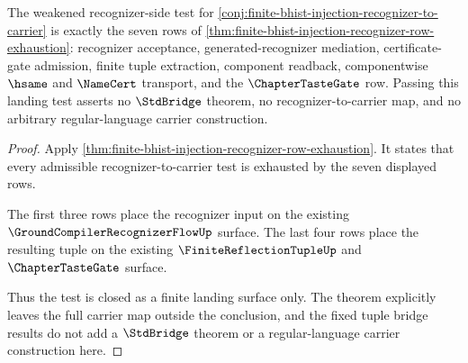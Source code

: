 \begin{proposition}
\label{prop:finite-bhist-injection-recognizer-closed-landing-test}
The weakened recognizer-side test for \autoref{conj:finite-bhist-injection-recognizer-to-carrier} is exactly the seven rows of \autoref{thm:finite-bhist-injection-recognizer-row-exhaustion}: recognizer acceptance, generated-recognizer mediation, certificate-gate admission, finite tuple extraction, component readback, componentwise $\hsame$ and $\NameCert$ transport, and the $\ChapterTasteGate$ row. Passing this landing test asserts no $\StdBridge$ theorem, no recognizer-to-carrier map, and no arbitrary regular-language carrier construction.
\end{proposition}
\begin{proof}
Apply \autoref{thm:finite-bhist-injection-recognizer-row-exhaustion}. It states that every admissible recognizer-to-carrier test is exhausted by the seven displayed rows.

The first three rows place the recognizer input on the existing $\GroundCompilerRecognizerFlowUp$ surface. The last four rows place the resulting tuple on the existing $\FiniteReflectionTupleUp$ and $\ChapterTasteGate$ surface.

Thus the test is closed as a finite landing surface only. The theorem explicitly leaves the full carrier map outside the conclusion, and the fixed tuple bridge results do not add a $\StdBridge$ theorem or a regular-language carrier construction here.
\end{proof}

